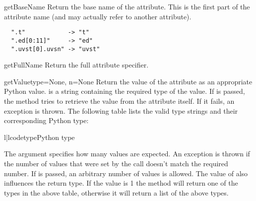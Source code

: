 \begin{methoddesc}{getBaseName}{}
Return the base name of the attribute. This is the first part of the
attribute name (and may actually refer to another attribute).

\begin{verbatim}
  ".t"            -> "t"
  ".ed[0:11]"     -> "ed"
  ".uvst[0].uvsn" -> "uvst"
\end{verbatim}
\end{methoddesc}

\begin{methoddesc}{getFullName}{}
Return the full attribute specifier.
\end{methoddesc}

\begin{methoddesc}{getValue}{type=None, n=None}
\label{AttributeGetValue}
Return the value of the attribute as an appropriate Python value.
 is a string containing the required type of the value.
If  is passed, the method tries to retrieve the value from
the attribute itself. If it fails, an exception is thrown. The following
table lists the valid type strings and their corresponding Python type:

\begin{tableii}{l|l}{code}{type}{Python type}
\end{tableii}

The argument  specifies how many values are expected. An exception
is thrown if the number of values that were set by the  call
doesn't match the required number. If  is passed, an arbitrary
number of values is allowed. The value of  also influences the
return type. If the value is 1 the method will return one of the types
in the above table, otherwise it will return a list of the above types.

\end{methoddesc}

